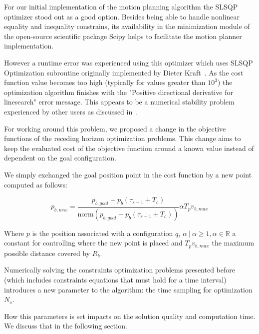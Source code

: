 \documentclass[eprint]{actapoly}
\begin{document}
For our initial implementation of the motion planning algorithm the
SLSQP optimizer stood out
as a good option. Besides being able to handle nonlinear equality and inequality 
constrains, its availability in the minimization module of the open-source
scientific package Scipy helps to facilitate the motion planner implementation.

However a runtime error was experienced using this optimizer which uses SLSQP 
Optimization subroutine originally implemented by Dieter Kraft~\cite{Kraft1988}.
As the cost function value becomes too high (typically for values greater than 
$10^3$) the optimization algorithm finishes with the "Positive 
directional derivative for linesearch" error message. This appears to be
a numerical stability problem experienced by other users as discussed in~\cite{slsqperror}.

For working around this problem, we proposed a change in the objective functions
of the receding horizon optimization problems. This change aims to keep the 
evaluated cost of the objective function around a known value instead of 
dependent on the goal configuration.

We simply exchanged the goal position point in the cost function by a new point computed as follows:

$$
    p_{b,new} = \frac{p_{b,goal} - p_{b}(\tau_{s-1}+T_c) }{\mathrm{norm}(p_{b,goal} - p_{b}(\tau_{s-1}+T_c) )} \alpha T_pv_{b,max}
$$

Where $p$ is the position associated with a configuration $q$, $\alpha\ |\ 
\alpha \geq 1, \alpha \in \mathbb{R}$ a constant for controlling where the
new point is placed and $T_pv_{b,max}$ the maximum possible distance covered by $R_b$.

Numerically solving the constraints optimization problems presented before (which includes constraints equations that must hold for a time interval) introduces
a new parameter to the algorithm: the time sampling for optimization $N_s$.

How this parameters is set impacts on the solution quality and computation time. We
discuss that in the following section.

\end{document}
